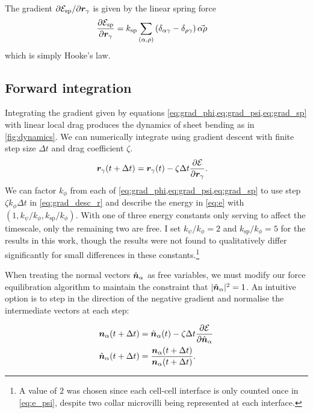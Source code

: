 The gradient $\partial \mathcal{E}_{\text{sp}} / \partial \bm{r}_\gamma$ is given by the linear spring force 
\begin{align}
	\frac{\partial\mathcal{E}_{\text{sp}}}{\partial\bm{r}_\gamma} &= k_{\text{sp}} \sum_{(\alpha,\rho)} \left(\delta_{\alpha\gamma} - \delta_{\rho\gamma} \right)\vec{\alpha\rho} \label{eq:grad_sp}
\end{align}
which is simply Hooke's law.

\subsection{Forward integration} \label{subsec:forward_int}

Integrating the gradient given by equations \cref{eq:grad_phi,eq:grad_psi,eq:grad_sp} with linear local drag produces the dynamics of sheet bending as in \cref{fig:dynamics}. 
We can numerically integrate using gradient descent with finite step size $\Delta t$ and drag coefficient $\zeta$.
\begin{align}
	\bm{r}_\gamma(t+\Delta t) &= \bm{r}_\gamma (t) - \zeta \Delta t \frac{\partial \mathcal{E}}{\partial \bm{r}_\gamma}. \label{eq:grad_desc_r}
\end{align}
We can factor $k_\phi$ from each of \cref{eq:grad_phi,eq:grad_psi,eq:grad_sp} to use step $\zeta k_\phi \Delta t$ in \cref{eq:grad_desc_r} and describe the energy in \cref{eq:e} with $(1, k_\psi / k_\phi, k_{\text{sp}} / k_\phi)$.
With one of three energy constants only serving to affect the timescale, only the remaining two are free.
I set $k_\psi / k_\phi = 2$ and $k_{\text{sp}} / k_\phi = 5$ for the results in this work, though the results were not found to qualitatively differ significantly for small differences in these constants.\footnote{A value of $2$ was chosen since each cell-cell interface is only counted once in \cref{eq:e_psi}, despite two collar microvilli being represented at each interface.}

When treating the normal vectors $\hat{\bm{n}}_\alpha$ as free variables, we must modify our force equilibration algorithm to maintain the constraint that $| \hat{\bm{n}}_\alpha |^2 = 1$. 
An intuitive option is to step in the direction of the negative gradient and normalise the intermediate vectors at each step:

\begin{align}
	\bm{n}_\alpha(t+\Delta t) &= \hat{\bm{n}}_\alpha(t) - \zeta \Delta t \frac{\partial \mathcal{E}}{\partial \hat{\bm{n}}_\alpha} \label{eq:grad_desc_n1}\\
	\hat{\bm{n}}_\alpha(t+\Delta t) &= \frac{\bm{n}_\alpha(t+\Delta t)}{\bm{n}_\alpha(t+\Delta t)}. \label{eq:grad_desc_n2}
\end{align}

